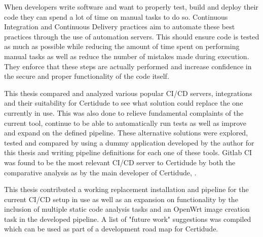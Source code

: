 When developers write software and want to properly test, build and deploy their code they can spend a lot of time on manual tasks to do so. Continuous Integration and Continuous Delivery practices aim to automate these best practices through the use of automation servers. This should ensure code is tested as much as possible while reducing the amount of time spent on performing manual tasks as well as reduce the number of mistakes made during execution. They enforce that these steps are actually performed and increase confidence in the secure and proper functionality of the code itself.

This thesis compared and analyzed various popular CI/CD servers, integrations and their suitability for Certidude to see what solution could replace the one currently in use. This was also done to relieve fundamental complaints of the current tool, continue to be able to automatically run tests as well as improve and expand on the defined pipeline. These alternative solutions were explored, tested and compared by using a dummy application developed by the author for this thesis and writing pipeline definitions for each one of these tools. Gitlab CI was found to be the most relevant CI/CD server to Certidude by both the comparative analysis as by the main developer of Certidude, \supervisor.

This thesis contributed a working replacement installation and pipeline for the current CI/CD setup in use as well as an expansion on functionality by the inclusion of multiple static code analysis tasks and an OpenWrt image creation task in the developed pipeline. A list of "future work" suggestions was compiled which can be used as part of a development road map for Certidude.